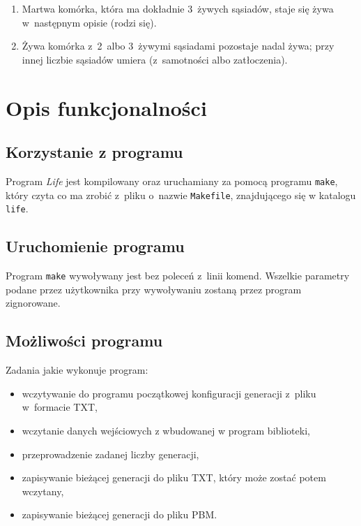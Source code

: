 \documentclass[a4paper,12pt,oneside]{article}
\begin{document}
\begin{enumerate}
\item Martwa komórka, która ma dokładnie 3~żywych sąsiadów, staje się żywa w~następnym opisie (rodzi się).
\item Żywa komórka z~2~albo 3~żywymi sąsiadami pozostaje nadal żywa; przy innej liczbie sąsiadów umiera (z~samotności albo zatłoczenia).
\end{enumerate}





\section{Opis funkcjonalności}


\subsection{Korzystanie z programu}
Program \textit{Life} jest kompilowany oraz uruchamiany za pomocą programu \verb+make+, który czyta co ma zrobić z~pliku o~nazwie \verb+Makefile+, znajdującego się w katalogu \verb+life+.


\subsection{Uruchomienie programu}
Program \verb+make+ wywoływany jest bez poleceń z~linii komend. Wszelkie parametry podane przez użytkownika przy wywoływaniu zostaną przez program zignorowane.

\subsection{Możliwości programu}

Zadania jakie wykonuje program:
\begin{itemize}
\item  wczytywanie do programu początkowej konfiguracji generacji z~pliku w~formacie TXT,\hspace{6in}
\item  wczytanie danych wejściowych z wbudowanej w program biblioteki,\hspace{6in}
\item  przeprowadzenie zadanej liczby generacji,\hspace{6in}
\item  zapisywanie bieżącej generacji do pliku TXT, który może zostać potem wczytany,\hspace{6in}
\item  zapisywanie bieżącej generacji do pliku PBM.
\end{itemize}
\end{document}
